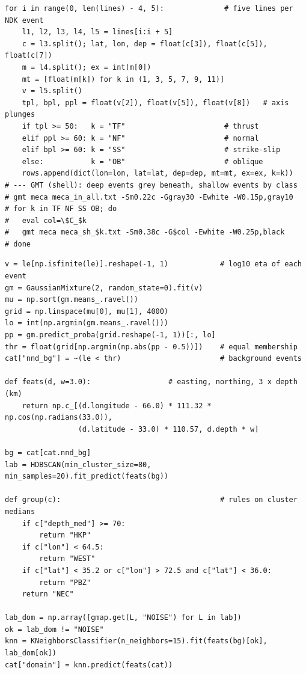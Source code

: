\documentclass[11pt]{article}
\begin{document}
\begin{lstlisting}[caption={Frohlich classification of Global CMT mechanisms read
from NDK records and GMT plotting of the mechanisms coloured by faulting style
(Python 3 and GMT 6.6.0; excerpt of fig\_focal\_mechanisms.sh).},label={lst:meca}]
for i in range(0, len(lines) - 4, 5):              # five lines per NDK event
    l1, l2, l3, l4, l5 = lines[i:i + 5]
    c = l3.split(); lat, lon, dep = float(c[3]), float(c[5]), float(c[7])
    m = l4.split(); ex = int(m[0])
    mt = [float(m[k]) for k in (1, 3, 5, 7, 9, 11)]
    v = l5.split()
    tpl, bpl, ppl = float(v[2]), float(v[5]), float(v[8])   # axis plunges
    if tpl >= 50:   k = "TF"                       # thrust
    elif ppl >= 60: k = "NF"                       # normal
    elif bpl >= 60: k = "SS"                       # strike-slip
    else:           k = "OB"                       # oblique
    rows.append(dict(lon=lon, lat=lat, dep=dep, mt=mt, ex=ex, k=k))
# --- GMT (shell): deep events grey beneath, shallow events by class
# gmt meca meca_in_all.txt -Sm0.22c -Ggray30 -Ewhite -W0.15p,gray10
# for k in TF NF SS OB; do
#   eval col=\$C_$k
#   gmt meca meca_sh_$k.txt -Sm0.38c -G$col -Ewhite -W0.25p,black
# done
\end{lstlisting}

\begin{lstlisting}[caption={Nearest-neighbour declustering with a Gaussian-mixture
threshold, HDBSCAN clustering of background hypocentres, grouping of clusters into
domains and k-nearest-neighbour labelling of all events (Python 3, scikit-learn;
excerpt of analysis.py).},label={lst:clustering}]
v = le[np.isfinite(le)].reshape(-1, 1)            # log10 eta of each event
gm = GaussianMixture(2, random_state=0).fit(v)
mu = np.sort(gm.means_.ravel())
grid = np.linspace(mu[0], mu[1], 4000)
lo = int(np.argmin(gm.means_.ravel()))
pp = gm.predict_proba(grid.reshape(-1, 1))[:, lo]
thr = float(grid[np.argmin(np.abs(pp - 0.5))])    # equal membership
cat["nnd_bg"] = ~(le < thr)                       # background events

def feats(d, w=3.0):                  # easting, northing, 3 x depth (km)
    return np.c_[(d.longitude - 66.0) * 111.32 * np.cos(np.radians(33.0)),
                 (d.latitude - 33.0) * 110.57, d.depth * w]

bg = cat[cat.nnd_bg]
lab = HDBSCAN(min_cluster_size=80, min_samples=20).fit_predict(feats(bg))

def group(c):                                     # rules on cluster medians
    if c["depth_med"] >= 70:
        return "HKP"
    if c["lon"] < 64.5:
        return "WEST"
    if c["lat"] < 35.2 or c["lon"] > 72.5 and c["lat"] < 36.0:
        return "PBZ"
    return "NEC"

lab_dom = np.array([gmap.get(L, "NOISE") for L in lab])
ok = lab_dom != "NOISE"
knn = KNeighborsClassifier(n_neighbors=15).fit(feats(bg)[ok], lab_dom[ok])
cat["domain"] = knn.predict(feats(cat))
\end{lstlisting}
\end{document}
